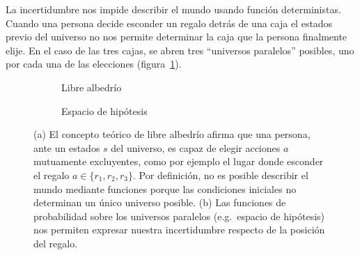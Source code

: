 \documentclass[a4paper,11pt]{book}
\theoremstyle{definition}
\begin{document}
La incertidumbre nos impide describir el mundo usando función deterministas.
%
Cuando una persona decide esconder un regalo detrás de una caja el estados previo del universo no nos permite determinar la caja que la persona finalmente elije.
%
En el caso de las tres cajas, se abren tres ``universos paralelos'' posibles, uno por cada una de las elecciones (figura~\ref{fig:libre_albedrio}).
%
\begin{figure}[ht!]
\centering
\begin{subfigure}[b]{0.48\textwidth}
\centering
    \caption{Libre albedr\'io}
    \label{fig:libre_albedrio}
\end{subfigure}
\begin{subfigure}[b]{0.48\textwidth}
 \centering
   \caption{Espacio de hip\'otesis}
   \label{fig:espacio_de_hipotesis}
\end{subfigure}
    \caption{(a) El concepto te\'orico de libre albedr\'io afirma que una persona, ante un estados $s$ del universo, es capaz de elegir acciones $a$ mutuamente excluyentes, como por ejemplo el lugar donde esconder el regalo $a \in \{r_1, r_2, r_3\}$. Por definición, no es posible describir el mundo mediante funciones porque las condiciones iniciales no determinan un único universo posible.
    (b) Las funciones de probabilidad sobre los universos paralelos (e.g.~espacio de hip\'otesis) nos permiten expresar nuestra incertidumbre respecto de la posición del regalo.}
\end{figure}
\end{document}
